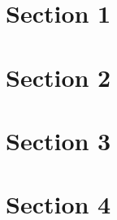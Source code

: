 \documentclass{article}
\begin{document}
\section{Section 1}
\lipsum

\section{Section 2}
\lipsum

\section{Section 3}
\lipsum

\section{Section 4}
\lipsum

\tableofcontents
\end{document}
